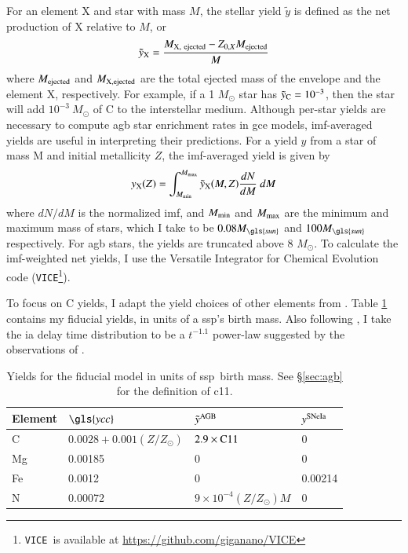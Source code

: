 \documentclass[12pt,oneside,letterpaper]{report}
\newcommand{\agb}{\gls{agb}}
\newcommand{\ia}{\gls{ia}}
\newcommand{\ssp}{\gls{ssp}}
\newcommand{\imf}{\gls{imf}}
\newcommand{\gce}{\gls{gce}}
\newcommand{\cxi}{\gls{c11}}
\newcommand{\Ycc}{\gls{ycc}}
\newcommand{\sun}{\gls{sun}}
\newcommand{\VICE}{\texttt{VICE}}
\begin{document}
For an element X and star with mass $M$, the stellar yield $\tilde{y}$ is defined as the net production of X relative to $M$, or
\begin{equation}
    \tilde{y}_{\rm X} = \frac{M_{\rm X,\ ejected} - Z_{0, X} M_{\rm ejected}}{M}   
\end{equation}
where $M_{\rm ejected}$ and $M_{\rm X, ejected}$  are the total ejected mass of the envelope and the element X, respectively. For example, if a 1 $M_\odot$ star has $\tilde{y}_{\rm C} = 10^{-3}$, then the star will add $10^{-3}\ M_\odot$ of C to the interstellar medium. 
Although per-star yields are necessary to compute \agb{} star enrichment rates in \gce{}  models, \imf-averaged yields are useful in interpreting their predictions. For a yield $y$ from a star of mass M and initial metallicity $Z$, the \imf-averaged yield is given by 
\begin{equation} \label{eq:imf-yield}
    y_{\rm X}(Z) = 
    \int_{M_{\rm min}}^{M_{\rm max}} 
    \tilde{y}_{\rm X}(M, Z)
    \frac{dN}{dM}  \ dM
\end{equation}
where ${dN}/{dM}$ is the normalized \imf, and $M_{\rm min}$ and $M_{\rm max}$ are the minimum and maximum mass of stars, which I take to be $0.08 M_{\sun}$ and $100 M_{\sun}$ respectively. For \agb{} stars, the yields are truncated above 8 $M_{\odot}$. 
To calculate the \imf-weighted net yields, I use the Versatile Integrator for Chemical Evolution code (\VICE\footnote{\VICE~is available at \url{https://github.com/giganano/VICE}}).

To focus on C yields, I adapt the yield choices of other elements from \citet{james+21, james+23}.
Table \ref{tab:fiducial_mod} contains my fiducial yields, in units of a \ssp's birth mass.
Also following \citet{james+21, james+23}, I take the \ia{} delay time distribution to be a
$t^{-1.1}$ power-law suggested by the observations of \citet{maoz+12}.


\begin{table}
	\centering
    \caption[Fiducial Model]{Yields for the fiducial model in units of \ssp~birth mass. See \S\ref{sec:agb} for the definition of \cxi.}
	\label{tab:fiducial_mod}

	\begin{tabular}{l l l l}
		\toprule
        Element & $\Ycc$ & $\tilde{y}^{\rm AGB}$ & $y^{\rm SNe Ia}$ \\
		\midrule
        C & $0.0028 + 0.001(Z/Z_\odot)$ & $2.9\times{\rm C11}$ &  0 \\
        Mg & 0.00185 & 0 & 0 \\
        Fe & 0.0012 & 0 & 0.00214 \\
        N & 0.00072 & $9\times10^{-4}(Z/Z_\odot)M$ & 0\\
		\bottomrule
	\end{tabular}
\end{table}
\end{document}
